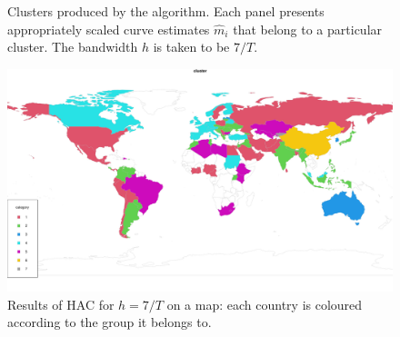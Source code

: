 \documentclass[a4paper,12pt]{article}
\numberwithin{equation}{section}
\begin{document}
\begin{figure}
\ContinuedFloat
\centering
\begin{subfigure}[b]{0.48\textwidth}
\end{subfigure}
\caption{Clusters produced by the algorithm. Each panel presents appropriately scaled curve estimates $\hat{m}_i$ that belong to a particular cluster. The bandwidth $h$ is taken to be $7/T$.}\label{fig:clusters}
\end{figure}

\begin{figure}[t!]
\begin{minipage}[t]{0.98\textwidth}
\includegraphics[width=\textwidth]{plots/7days/choropleth}
\caption{Results of HAC for $h = 7/T$ on a map: each country is coloured according to the group it belongs to.}\label{fig:map}
\end{minipage}
\end{figure}
\end{document}
